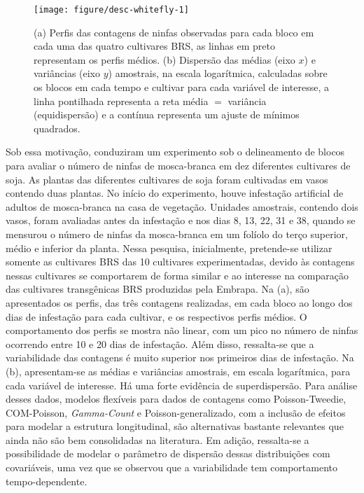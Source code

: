 \documentclass[
    oldfontcommands,
    11pt,
    openright,
    twoside,
    a4paper,
    english,
    brazil
]{abntex2}\usepackage[]{graphicx}\usepackage[]{color}
\newenvironment{knitrout}{}{} %
\begin{document}
\begin{knitrout}
\color{fgcolor}\begin{figure}[!htb]

{\centering \texttt{[image: figure/desc-whitefly-1]} 

}

\caption[(a) Perfis das contagens de ninfas observadas para cada bloco em cada uma das quatro cultivares BRS, as linhas em preto representam os perfis médios]{(a) Perfis das contagens de ninfas observadas para cada bloco em cada uma das quatro cultivares BRS, as linhas em preto representam os perfis médios. (b) Dispersão das médias (eixo $x$) e variâncias (eixo $y$) amostrais, na escala logarítmica, calculadas sobre os blocos em cada tempo e cultivar para cada variável de interesse, a linha pontilhada representa a reta média $=$ variância (equidispersão) e a contínua representa um ajuste de mínimos quadrados.}\label{fig:desc-whitefly}
\end{figure}


\end{knitrout}

Sob essa motivação, \citet{Suekane2013} conduziram um experimento sob o
delineamento de blocos para avaliar o número de ninfas de mosca-branca
em dez diferentes cultivares de soja. As plantas das diferentes
cultivares de soja foram cultivadas em vasos contendo duas plantas. No
início do experimento, houve infestação artificial de adultos de
mosca-branca na casa de vegetação. Unidades amostrais, contendo dois
vasos, foram avaliadas antes da infestação e nos dias 8, 13, 22, 31 e
38, quando se mensurou o número de ninfas da mosca-branca em um folíolo
do terço superior, médio e inferior da planta. Nessa pesquisa,
inicialmente, pretende-se utilizar somente as cultivares BRS das 10
cultivares experimentadas, devido às contagens nessas cultivares se
comportarem de forma similar e ao interesse na comparação das cultivares
transgênicas BRS produzidas pela Embrapa. Na
(a), são apresentados os perfis, das três
contagens realizadas, em cada bloco ao longo dos dias de infestação para
cada cultivar, e os respectivos perfis médios. O comportamento dos
perfis se mostra não linear, com um pico no número de ninfas ocorrendo
entre 10 e 20 dias de infestação. Além disso, ressalta-se que a
variabilidade das contagens é muito superior nos primeiros dias de
infestação. Na (b), apresentam-se as médias e
variâncias amostrais, em escala logarítmica, para cada variável de
interesse. Há uma forte evidência de superdispersão. Para análise desses
dados, modelos flexíveis para dados de contagens como Poisson-Tweedie,
COM-Poisson, \textit{Gamma-Count} e Poisson-generalizado, com a inclusão
de efeitos para modelar a estrutura longitudinal, são alternativas
bastante relevantes que ainda não são bem consolidadas na literatura. Em
adição, ressalta-se a possibilidade de modelar o parâmetro de dispersão
dessas distribuições com covariáveis, uma vez que se observou que a
variabilidade tem comportamento tempo-dependente.
\end{document}

